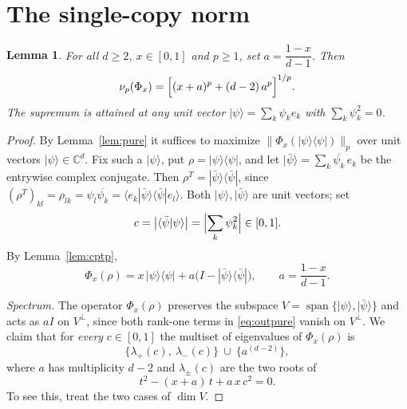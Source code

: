 \documentclass{amsart}
\newtheorem{lemma}{Lemma}
\theoremstyle{definition}
\begin{document}
\section{The single-copy norm}

\begin{lemma}\label{lem:single}
For all $d\ge2$, $x\in[0,1]$ and $p\ge1$, set $a=\dfrac{1-x}{d-1}$. Then
\begin{equation}\label{eq:nuformula}
\nu_p(\Phi_x)=\Bigl[(x+a)^{p}+(d-2)\,a^{p}\Bigr]^{1/p}.
\end{equation}
The supremum is attained at any unit vector $|\psi\rangle=\sum_k\psi_k e_k$ with
$\sum_k\psi_k^{2}=0$.
\end{lemma}

\begin{proof}
By Lemma~\ref{lem:pure} it suffices to maximize
$\|\Phi_x(|\psi\rangle\langle\psi|)\|_p$ over unit vectors $|\psi\rangle\in\mathbb
C^d$. Fix such a $|\psi\rangle$, put $\rho=|\psi\rangle\langle\psi|$, and let
$|\bar\psi\rangle=\sum_k\overline{\psi_k}\,e_k$ be the entrywise complex
conjugate. Then $\rho^{T}=|\bar\psi\rangle\langle\bar\psi|$, since
$(\rho^{T})_{kl}=\rho_{lk}=\psi_l\overline{\psi_k}
=\langle e_k|\bar\psi\rangle\langle\bar\psi|e_l\rangle$. Both
$|\psi\rangle,|\bar\psi\rangle$ are unit vectors; set
\[
c=\bigl|\langle\bar\psi|\psi\rangle\bigr|
=\Bigl|\sum_k \psi_k^{2}\Bigr|\in[0,1].
\]
By Lemma~\ref{lem:cptp},
\begin{equation}\label{eq:outpure}
\Phi_x(\rho)=x\,|\psi\rangle\langle\psi|
+a\bigl(I-|\bar\psi\rangle\langle\bar\psi|\bigr),
\qquad a=\frac{1-x}{d-1}.
\end{equation}

\emph{Spectrum.} The operator $\Phi_x(\rho)$ preserves the subspace
$V=\operatorname{span}\{|\psi\rangle,|\bar\psi\rangle\}$ and acts as $aI$ on
$V^{\perp}$, since both rank-one terms in \eqref{eq:outpure} vanish on
$V^{\perp}$. We claim that for \emph{every} $c\in[0,1]$ the multiset of
eigenvalues of $\Phi_x(\rho)$ is
\begin{equation}\label{eq:spec}
\bigl\{\lambda_+(c),\ \lambda_-(c)\bigr\}\ \cup\ \{a^{(d-2)}\},
\end{equation}
where $a$ has multiplicity $d-2$ and $\lambda_\pm(c)$ are the two roots of
\begin{equation}\label{eq:roots}
t^{2}-(x+a)\,t+a\,x\,c^{2}=0 .
\end{equation}
To see this, treat the two cases of $\dim V$.


\end{proof}
\end{document}
